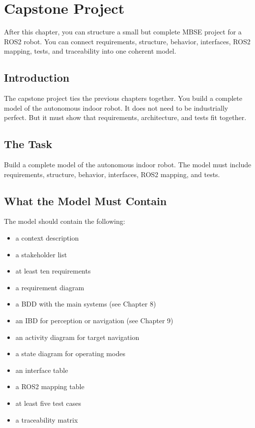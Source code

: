 \chapter{Capstone Project}

\begin{lernziele}
After this chapter, you can structure a small but complete MBSE project for a ROS2 robot. You can connect requirements, structure, behavior, interfaces, ROS2 mapping, tests, and traceability into one coherent model.
\end{lernziele}

\section{Introduction}
The capstone project ties the previous chapters together. You build a complete model of the autonomous indoor robot. It does not need to be industrially perfect. But it must show that requirements, architecture, and tests fit together.

\section{The Task}
Build a complete model of the autonomous indoor robot. The model must include requirements, structure, behavior, interfaces, ROS2 mapping, and tests.

\section{What the Model Must Contain}
The model should contain the following:

\begin{itemize}
    \item a context description
    \item a stakeholder list
    \item at least ten requirements
    \item a requirement diagram
    \item a BDD with the main systems (see Chapter 8)
    \item an IBD for perception or navigation (see Chapter 9)
    \item an activity diagram for target navigation
    \item a state diagram for operating modes
    \item an interface table
    \item a ROS2 mapping table
    \item at least five test cases
    \item a traceability matrix
\end{itemize}

